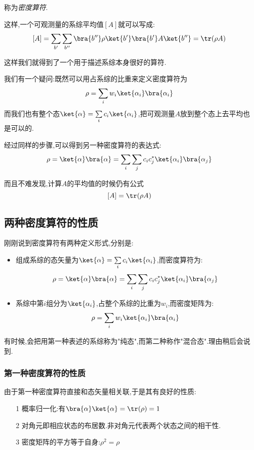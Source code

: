     称为\emph{密度算符}.

    \vspace*{0.5cm}

    这样,一个可观测量的系综平均值$\left[ A \right] $就可以写成:
    \begin{equation}
      \left[ A \right] =\sum_{b'}\sum_{b''}\bra{b''}\rho\ket{b'}\bra{b'}A\ket{b''}=\tr(\rho A)
    \end{equation}

    这样我们就得到了一个用于描述系综本身很好的算符.

    我们有一个疑问:既然可以用占系综的比重来定义密度算符为
    \[\rho=\sum_i w_i \ket{\alpha_i}\bra{\alpha_i}\]
    而我们也有整个态$\ket{\alpha}=\sum\limits_i c_i \ket{\alpha_i}$,把可观测量$A$放到整个态上去平均也是可以的.

    经过同样的步骤,可以得到另一种密度算符的表达式:
    \begin{equation}
      \rho=\ket{\alpha}\bra{\alpha}=\sum_i \sum_j c_i c_j^{*}\ket{\alpha_i}\bra{\alpha_j}
    \end{equation}
    
    而且不难发现,计算$A$的平均值的时候仍有公式
    \[\left[ A \right] =\tr(\rho A)\]

\subsection{两种密度算符的性质}

    刚刚说到密度算符有两种定义形式,分别是:
    \begin{itemize}
        \item 组成系综的态矢量为$\ket{\alpha}=\sum\limits_i c_i\ket{\alpha_i}$,而密度算符为:
            \begin{equation}
              \rho=\ket{\alpha}\bra{\alpha}=\sum_i \sum_j c_i c_j^{*}\ket{\alpha_i}\bra{\alpha_j}
            \end{equation}
        
        \item 系综中第$i$组分为$\ket{\alpha_i}$,占整个系综的比重为$w_i$,而密度矩阵为:
            \begin{equation}
                \rho=\sum_i w_i \ket{\alpha_i}\bra{\alpha_i}
            \end{equation}
            
    \end{itemize}
    有时候,会把用第一种表述的系综称为"纯态",而第二种称作"混合态".理由稍后会说到.

\subsubsection*{第一种密度算符的性质}
    由于第一种密度算符直接和态矢量相关联,于是其有良好的性质:
    \begin{itemize}
        \item[1] 概率归一化:有$\bra{\alpha}\ket{\alpha}=\tr(\rho)=1$
        \item[2] 对角元即相应状态的布居数.非对角元代表两个状态之间的相干性.
        \item[3] 密度矩阵的平方等于自身:$\rho^{2}=\rho$
    \end{itemize}



